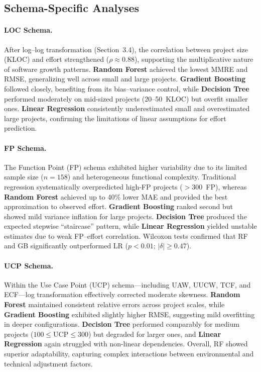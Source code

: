 \documentclass[11pt,a4paper]{article}
\begin{document}
\subsection{Schema-Specific Analyses}


\paragraph{LOC Schema.}
After log–log transformation (Section~3.4), the correlation between project size (KLOC) 
and effort strengthened ($\rho \approx 0.88$), supporting the multiplicative nature of 
software growth patterns.  
\textbf{Random Forest} achieved the lowest MMRE and RMSE, generalizing well 
across small and large projects.  
\textbf{Gradient Boosting} followed closely, benefiting from its bias–variance control, 
while \textbf{Decision Tree} performed moderately on mid-sized projects (20–50~KLOC) 
but overfit smaller ones.  
\textbf{Linear Regression} consistently underestimated small and overestimated large projects, 
confirming the limitations of linear assumptions for effort prediction.

\paragraph{FP Schema.}
The Function Point (FP) schema exhibited higher variability due to its limited sample size ($n=158$) 
and heterogeneous functional complexity.  
Traditional regression systematically overpredicted high-FP projects ($>300$~FP), 
whereas \textbf{Random Forest} achieved up to 40\% lower MAE and provided 
the best approximation to observed effort.  
\textbf{Gradient Boosting} ranked second but showed mild variance inflation for large projects.  
\textbf{Decision Tree} produced the expected stepwise “staircase” pattern, 
while \textbf{Linear Regression} yielded unstable estimates due to weak FP–effort correlation.  
Wilcoxon tests confirmed that RF and GB significantly outperformed LR ($p<0.01$; $|\delta|\ge0.47$).

\paragraph{UCP Schema.}
Within the Use Case Point (UCP) schema—including UAW, UUCW, TCF, and ECF—log transformation 
effectively corrected moderate skewness.  
\textbf{Random Forest} maintained consistent relative errors across project scales, 
while \textbf{Gradient Boosting} exhibited slightly higher RMSE, 
suggesting mild overfitting in deeper configurations.  
\textbf{Decision Tree} performed comparably for medium projects ($100\!\le\!\mathrm{UCP}\!\le\!300$) 
but degraded for larger ones, and \textbf{Linear Regression} again struggled with non-linear dependencies.  
Overall, RF showed superior adaptability, capturing complex interactions between 
environmental and technical adjustment factors.
\end{document}
